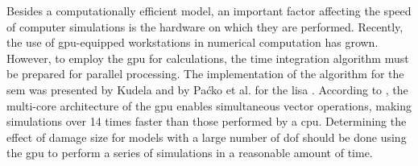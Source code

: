 Besides a computationally efficient model, an important factor affecting the speed of computer simulations is the hardware on which they are performed.
Recently, the use of \ac{gpu}-equipped workstations in numerical computation has grown.
However, to employ the \ac{gpu} for calculations, the time integration algorithm must be prepared for parallel processing.
The implementation of the algorithm for the \ac{sem} was presented by Kudela \cite{kudela2016parallel} and by Paćko et al. for the \ac{lisa} \cite{packo2012lamb}.
According to \cite{kudela2016parallel}, the multi-core architecture of the \ac{gpu} enables simultaneous vector operations, making simulations over 14 times faster than those performed by a \ac{cpu}.
Determining the effect of damage size for models with a large number of \ac{dof} should be done using the \ac{gpu} to perform a series of simulations in a reasonable amount of time.